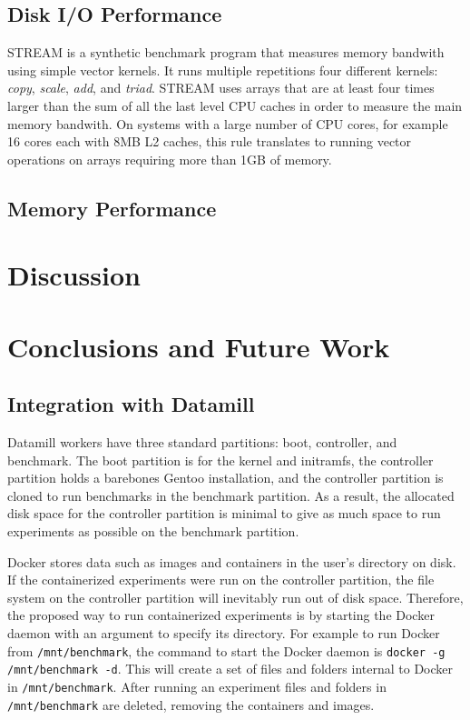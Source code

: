 \documentclass[11pt]{article}
\begin{document}
\subsection{Disk I/O Performance}
STREAM is a synthetic benchmark program that measures memory bandwith using simple vector kernels. It runs multiple repetitions four different kernels: \textit{copy}, \textit{scale}, \textit{add}, and \textit{triad}. STREAM uses arrays that are at least four times larger than the sum of all the last level CPU caches in order to measure the main memory bandwith. On systems with a large number of CPU cores, for example 16 cores each with 8MB L2 caches, this rule translates to running vector operations on arrays requiring more than 1GB of memory. 

\subsection{Memory Performance}

\section{Discussion}

\section{Conclusions and Future Work}

\subsection{Integration with Datamill}
Datamill workers have three standard partitions: boot, controller, and benchmark. The boot partition is for the kernel and initramfs, the controller partition holds a barebones Gentoo installation, and the controller partition is cloned to run benchmarks in the benchmark partition. As a result, the allocated disk space for the controller partition is minimal to give as much space to run experiments as possible on the benchmark partition. 

Docker stores data such as images and containers in the user’s directory on disk. If the containerized experiments were run on the controller partition, the file system on the controller partition will inevitably run out of disk space. Therefore, the proposed way to run containerized experiments is by starting the Docker daemon with an argument to specify its directory. For example to run Docker from \texttt{/mnt/benchmark}, the command to start the Docker daemon is \texttt{docker -g /mnt/benchmark -d}. This will create a set of files and folders internal to Docker in \texttt{/mnt/benchmark}. After running an experiment files and folders in \texttt{/mnt/benchmark} are deleted, removing the containers and images. 
\end{document}

